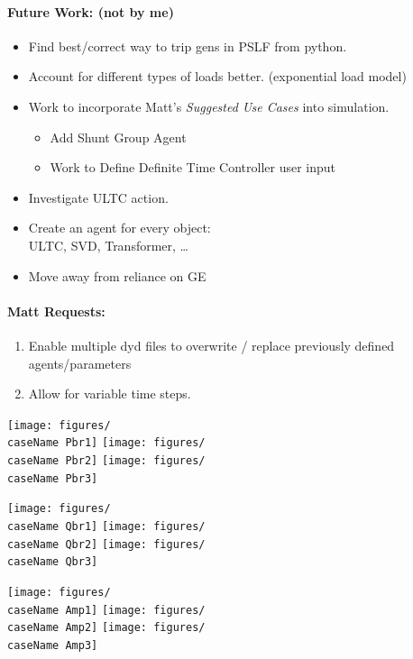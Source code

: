 \documentclass[12pt]{article}
\begin{document}
\begin{multicols}{2}
\begin{enumerate}
		
	\end{enumerate}
\paragraph{Future Work: (not by me)}
\begin{itemize}
\item Find best/correct way to trip gens in PSLF from python.
\item Account for different types of loads better. (exponential load model) %
\item Work to incorporate Matt's \emph{Suggested Use Cases} into simulation.
		\begin{itemize}
		\item Add Shunt Group Agent
		\item Work to Define Definite Time Controller user input
		\end{itemize} 


		\item Investigate ULTC action.

		\item Create an agent for every object: \\ ULTC, SVD, Transformer, \ldots

		\item Move away from reliance on GE
		
\end{itemize}

\paragraph{Matt Requests:}
\begin{enumerate}
		\item Enable multiple dyd files to overwrite / replace previously defined agents/parameters
		\item Allow for variable time steps.
\end{enumerate}

\vfill\null
\end{multicols}

\pagebreak

\newcommand{\caseName}{SixMachineRamp1}
\begin{landscape}

\texttt{[image: figures/\\caseName Pbr1]}%
\texttt{[image: figures/\\caseName Pbr2]}%
\texttt{[image: figures/\\caseName Pbr3]}

\texttt{[image: figures/\\caseName Qbr1]}%
\texttt{[image: figures/\\caseName Qbr2]}%
\texttt{[image: figures/\\caseName Qbr3]}

\texttt{[image: figures/\\caseName Amp1]}%
\texttt{[image: figures/\\caseName Amp2]}%
\texttt{[image: figures/\\caseName Amp3]}

\end{landscape}
\pagebreak
\end{document}
